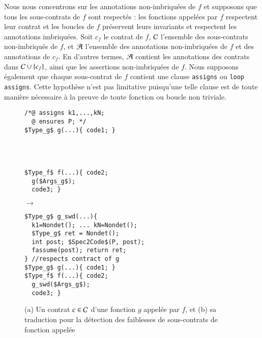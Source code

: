 Nous nous concentrons sur les annotations non-imbriquées de $f$ et supposons que
tous les sous-contrats de $f$ sont respectés : les fonctions appelées par $f$
respectent leur contrat et les boucles de $f$ préservent leurs invariants et
respectent les annotations imbriquées.
Soit $c_f$ le contrat de $f$, ${\mathcal{C}}$ l'ensemble des sous-contrats non-imbriqués
de $f$, et ${\mathcal{A}}$ l'ensemble des annotations non-imbriquées de $f$ et des
annotations de $c_f$.
En d'autres termes, ${\mathcal{A}}$ contient les annotations des contrats dans
${\mathcal{C}}\cup\{c_f\}$, ainsi que les assertions non-imbriquées de $f$.
Nous supposons également que chaque sous-contrat de $f$ contient une clause
\lstinline'assigns' ou \lstinline'loop assigns'.
Cette hypothèse n'est pas limitative puisqu'une telle clause est de toute
manière nécessaire à la preuve de toute fonction ou boucle non triviale.


\begin{figure}[tb]
\begin{center}
\begin{minipage}{0.35\columnwidth}
\begin{lstlisting}[mathescape]
/*@ assigns k1,...,kN;
  @ ensures P; */
$Type_g$ g(...){ code1; }




$Type_f$ f(...){ code2;
  g($Args_g$);
  code3; }
\end{lstlisting}
\end{minipage}
\hspace{-6mm}
\begin{minipage}{0.07\columnwidth}$\to$\end{minipage}
\begin{minipage}{0.35\columnwidth}
\begin{lstlisting}[mathescape]
$Type_g$ g_swd(...){
  k1=Nondet(); ... kN=Nondet();
  $Type_g$ ret = Nondet();
  int post; $Spec2Code$(P, post);
  fassume(post); return ret;
} //respects contract of g
$Type_g$ g(...){ code1; }
$Type_f$ f(...){ code2;
  g_swd($Args_g$);
  code3; }
\end{lstlisting}
\end{minipage}
\vspace{-3mm}
\caption{(a) Un contrat $c\in{\ensuremath\mathcal{C}}$ d'une fonction $g$ appelée par $f$, et
(b) sa traduction pour la détection des faiblesses de sous-contrats de fonction
appelée}
\vspace{-3mm}
\label{fig:CW-transf-functions}
\end{center}
\end{figure}



